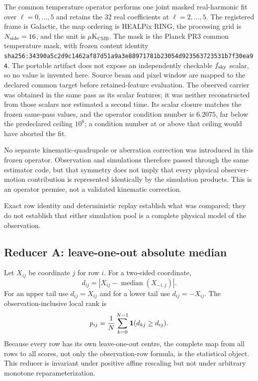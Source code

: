 \documentclass[11pt,a4paper]{article}
\newcommand{\microK}{\mu\mathrm{K}_{\mathrm{CMB}}}
\begin{document}
The common temperature operator performs one joint masked real-harmonic fit
over $\ell=0,\ldots,5$ and retains the 32 real coefficients at
$\ell=2,\ldots,5$.  The registered frame is Galactic, the map ordering is
HEALPix RING, the processing grid is $N_{\rm side}=16$, and the unit is
$\microK$.  The mask is the Planck PR3 common temperature mask, with frozen
content identity
\nolinkurl{sha256:34390a5c2d9c1462af87d51a9a3e88971781b23054d923563723531b7f30ea94}.
The portable artifact does not expose an independently checkable
$f_{\rm sky}$ scalar, so no value is invented here.  Source beam and pixel
window are mapped to the declared common target before retained-feature
evaluation.  The observed carrier was obtained in
the same pass as its scalar features; it was neither reconstructed from those
scalars nor estimated a second time.  Its scalar closure matches the frozen
same-pass values, and the operator condition number is $6.2075$, far below the
predeclared ceiling $10^8$; a condition number at or above that ceiling would
have aborted the fit.

No separate kinematic-quadrupole or aberration correction was introduced in
this frozen operator.  Observation and simulations therefore passed through
the same estimator code, but that symmetry does not imply that every physical
observer-motion contribution is represented identically by the simulation
products.  This is an operator premise, not a validated kinematic correction.

Exact row identity and deterministic replay establish what was compared; they
do not establish that either simulation pool is a complete physical model of
the observation.

\subsection{Reducer A: leave-one-out absolute median}

Let $X_{ij}$ be coordinate $j$ for row $i$.  For a two-sided coordinate,
\begin{equation}
d_{ij}=\left|X_{ij}-\operatorname{median}(X_{-i,j})\right|.
\label{eq:absmedian}
\end{equation}
For an upper tail use $d_{ij}=X_{ij}$ and for a lower tail use
$d_{ij}=-X_{ij}$.  The observation-inclusive local rank is
\begin{equation}
p_{ij}=\frac1N\sum_{k=0}^{N-1}{\bf1}(d_{kj}\ge d_{ij}).
\label{eq:local-rank}
\end{equation}
Because every row has its own leave-one-out centre, the complete map from all
rows to all scores, not only the observation-row formula, is the statistical
object.  This reducer is invariant under positive affine rescaling but not
under arbitrary monotone reparameterization.
\end{document}
